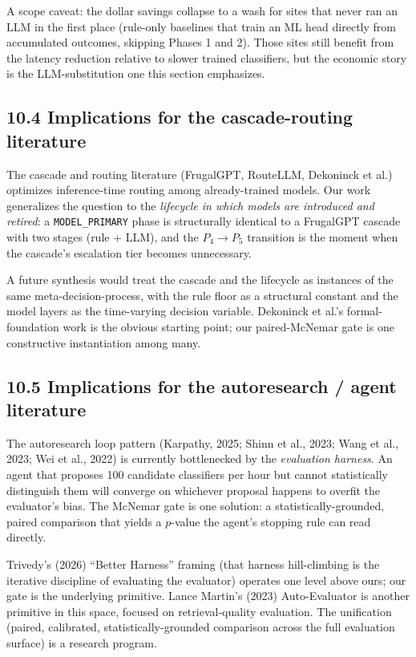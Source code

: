 A scope caveat: the dollar savings collapse to a wash for sites that
never ran an LLM in the first place (rule-only baselines that train an
ML head directly from accumulated outcomes, skipping Phases 1 and 2).
Those sites still benefit from the latency reduction relative to slower
trained classifiers, but the economic story is the LLM-substitution one
this section emphasizes.

\subsection{10.4 Implications for the cascade-routing
literature}\label{implications-for-the-cascade-routing-literature}

The cascade and routing literature (FrugalGPT, RouteLLM, Dekoninck et
al.) optimizes inference-time routing among already-trained models. Our
work generalizes the question to the \emph{lifecycle in which models are
introduced and retired}: a \texttt{MODEL\_PRIMARY} phase is structurally
identical to a FrugalGPT cascade with two stages (rule + LLM), and the
\(P_4 \to P_5\) transition is the moment when the cascade's escalation
tier becomes unnecessary.

A future synthesis would treat the cascade and the lifecycle as
instances of the same meta-decision-process, with the rule floor as a
structural constant and the model layers as the time-varying decision
variable. Dekoninck et al.'s formal-foundation work is the obvious
starting point; our paired-McNemar gate is one constructive
instantiation among many.

\subsection{10.5 Implications for the autoresearch / agent
literature}\label{implications-for-the-autoresearch-agent-literature}

The autoresearch loop pattern (Karpathy, 2025; Shinn et al., 2023; Wang
et al., 2023; Wei et al., 2022) is currently bottlenecked by the
\emph{evaluation harness}. An agent that proposes 100 candidate
classifiers per hour but cannot statistically distinguish them will
converge on whichever proposal happens to overfit the evaluator's bias.
The McNemar gate is one solution: a statistically-grounded, paired
comparison that yields a \(p\)-value the agent's stopping rule can read
directly.

Trivedy's (2026) ``Better Harness'' framing (that harness hill-climbing
is the iterative discipline of evaluating the evaluator) operates one
level above ours; our gate is the underlying primitive. Lance Martin's
(2023) Auto-Evaluator is another primitive in this space, focused on
retrieval-quality evaluation. The unification (paired, calibrated,
statistically-grounded comparison across the full evaluation surface) is
a research program.

